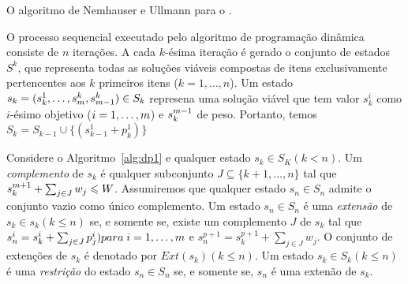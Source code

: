 

\begin{algorithm}
  \caption{O algoritmo de Nemhauser e Ullmann para o \mokp.}
  \label{alg:dp1}
  
\end{algorithm}



O processo sequencial executado pelo algoritmo de programação dinâmica
consiste de $n$ iterações.
A cada $k$-ésima iteração é gerado o conjunto de estados $S^k$,
que representa todas as soluções viáveis compostas de itens exclusivamente
pertencentes aos $k$ primeiros itens ($k = 1, \ldots, n$).
Um estado $s_k = (s_k^1, \ldots, s_m^k, s_{m-1}^k) \in S_k$ represena uma solução
viável que tem valor $s^i_k$ como $i$-ésimo objetivo ($i = 1, \ldots, m$)
e $s^{m-1}_k$ de peso.
Portanto, temos $S_k = S_{k-1} \cup \{(s^1_{k-1}+p^1_k)\}$



\begin{mydef}
Considere o Algoritmo~\ref{alg:dp1} e qualquer estado $s_k \in S_K (k < n)$.
Um \emph{complemento} de $s_k$ é qualquer subconjunto  $J \subseteq \{k+1, \ldots, n\}$
tal que $s_k^{m+1} + \sum_{j \in J} w_j \leqslant W$.
Assumiremos que qualquer estado $s_n \in S_n$ admite o conjunto vazio como único complemento.
Um estado $s_n \in S_n$ é uma \emph{extensão} de $s_k \in s_k (k \leq n )$ se, e somente se,
existe um complemento $J$ de $s_k$ tal que $s_n^i = s_k^i + \sum_{j \in J} p_j^i) para \; i = 1, \ldots, m$
e $s_n^{p+1} = s_k^{p+1} + \sum_{j \in J} w_j$.
O conjunto de extenções de $s_k$ é denotado por $Ext(s_k) (k \leq n)$.
Um estado $s_k \in S_k (k \leq n)$ é uma \emph{restrição} do estado $s_n \in S_n$
se, e somente se, $s_n$ é uma extenão de $s_k$.
\end{mydef}

